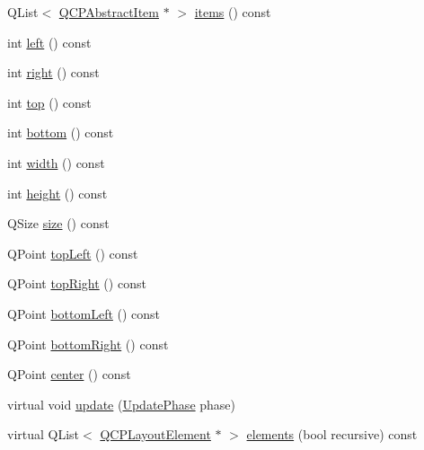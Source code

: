 \begin{DoxyCompactItemize}
\item 
\-Q\-List$<$ \hyperlink{classQCPAbstractItem}{\-Q\-C\-P\-Abstract\-Item} $\ast$ $>$ \hyperlink{classQCPAxisRect_a0f17ed539962cfcbaca8ce0b1776c840}{items} () const 
\item 
int \hyperlink{classQCPAxisRect_a55b3ecf72a3a65b053f7651b88db458d}{left} () const 
\item 
int \hyperlink{classQCPAxisRect_a6d0f989fc552aa2b563cf82f8fc81e61}{right} () const 
\item 
int \hyperlink{classQCPAxisRect_ac45aef1eb75cea46b241b6303028a607}{top} () const 
\item 
int \hyperlink{classQCPAxisRect_af2b5982ebe7e6f781b9bf1cc371a60d8}{bottom} () const 
\item 
int \hyperlink{classQCPAxisRect_a45bf5c17f4ca29131b7eb0db06efc259}{width} () const 
\item 
int \hyperlink{classQCPAxisRect_a1c55c4f3bef40cf01b21820316c8469e}{height} () const 
\item 
\-Q\-Size \hyperlink{classQCPAxisRect_a871b9fe49e92b39a3cbe29a59e458536}{size} () const 
\item 
\-Q\-Point \hyperlink{classQCPAxisRect_a88acbe716bcf5072790a6f95637c40d8}{top\-Left} () const 
\item 
\-Q\-Point \hyperlink{classQCPAxisRect_a232409546394c23b59407bc62fa460a8}{top\-Right} () const 
\item 
\-Q\-Point \hyperlink{classQCPAxisRect_a724b0333971ea6a338f0dbd814dc97ae}{bottom\-Left} () const 
\item 
\-Q\-Point \hyperlink{classQCPAxisRect_a49ea3c7dff834b47e266cbf3d79f78b9}{bottom\-Right} () const 
\item 
\-Q\-Point \hyperlink{classQCPAxisRect_aea5e6042bca198424fa1bc02fc282e59}{center} () const 
\item 
virtual void \hyperlink{classQCPAxisRect_a255080a017df9083a60a321ef2ba9ed8}{update} (\hyperlink{classQCPLayoutElement_a0d83360e05735735aaf6d7983c56374d}{\-Update\-Phase} phase)
\item 
virtual \-Q\-List$<$ \hyperlink{classQCPLayoutElement}{\-Q\-C\-P\-Layout\-Element} $\ast$ $>$ \hyperlink{classQCPAxisRect_a2bda6bf2b5b5797f92583cecd01c8949}{elements} (bool recursive) const 
\end{DoxyCompactItemize}
